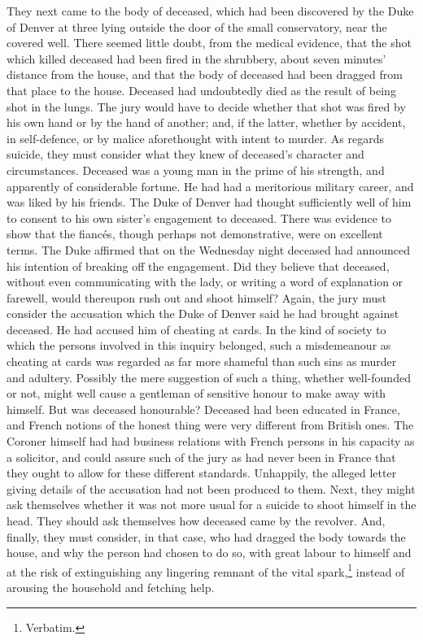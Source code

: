 They next came to the body of deceased, which had been discovered by the Duke of Denver at three  lying outside the door of the small conservatory, near the covered well. There seemed little doubt, from the medical evidence, that the shot which killed deceased had been fired in the shrubbery, about seven minutes' distance from the house, and that the body of deceased had been dragged from that place to the house. Deceased had undoubtedly died as the result of being shot in the lungs. The jury would have to decide whether that shot was fired by his own hand or by the hand of another; and, if the latter, whether by accident, in self-defence, or by malice aforethought with intent to murder. As regards suicide, they must consider what they knew of deceased's character and circumstances. Deceased was a young man in the prime of his strength, and apparently of considerable fortune. He had had a meritorious military career, and was liked by his friends. The Duke of Denver had thought sufficiently well of him to consent to his own sister's engagement to deceased. There was evidence to show that the fiancés, though perhaps not demonstrative, were on excellent terms.  The Duke affirmed that on the Wednesday night deceased had announced his intention of breaking off the engagement. Did they believe that deceased, without even communicating with the lady, or writing a word of explanation or farewell, would thereupon rush out and shoot himself?  Again, the jury must consider the accusation which the Duke of Denver said he had brought against deceased. He had accused him of cheating at cards. In the kind of society to which the persons involved in this inquiry belonged, such a misdemeanour as cheating at cards was regarded as far more shameful than such sins as murder and adultery.  Possibly the mere suggestion of such a thing, whether well-founded or not, might well cause a gentleman of sensitive honour to make away with himself. But was deceased honourable? Deceased had been educated in France, and French notions of the honest thing were very different from British ones. The Coroner himself had had business relations with French persons in his capacity as a solicitor, and could assure such of the jury as had never been in France that they ought to allow for these different standards. Unhappily, the alleged letter giving details of the accusation had not been produced to them. Next, they might ask themselves whether it was not more usual for a suicide to shoot himself in the head. They should ask themselves how deceased came by the revolver. And, finally, they must consider, in that case, who had dragged the body towards the house, and why the person had chosen to do so, with great labour to himself and at the risk of extinguishing any lingering remnant of the vital spark,\footnote{Verbatim.} instead of arousing the household and fetching help.

